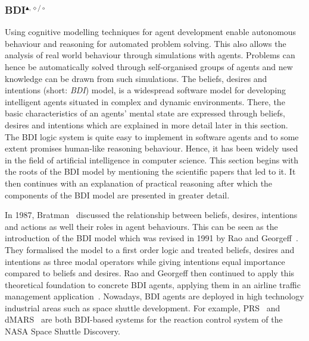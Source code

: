 \subsubsection[BDI]{BDI$^{\blacktriangle,\diamond/\circ}$}\label{fun:BDI}
Using cognitive modelling techniques for agent development enable autonomous behaviour and reasoning for automated problem solving.
This also allows the analysis of real world behaviour through simulations with agents.
Problems can hence be automatically solved through self-organised groups of agents and new knowledge can be drawn from such simulations.
The beliefs, desires and intentions (short: \emph{BDI}) model, is a widespread software model for developing intelligent agents situated in complex and dynamic environments.
There, the basic characteristics of an agents' mental state are expressed through beliefs, desires and intentions which are explained in more detail later in this section.
The BDI logic system is quite easy to implement in software agents and to some extent promises human-like reasoning behaviour.
Hence, it has been widely used in the field of artificial intelligence in computer science.
This section begins with the roots of the BDI model by mentioning the scientific papers that led to it.
It then continues with an explanation of practical reasoning after which the components of the BDI model are presented in greater detail.

In 1987, Bratman~\cite{MICHAEL_PlansResource_1988} discussed the relationship between beliefs, desires, intentions and actions as well their roles in agent behaviours.
This can be seen as the introduction of the BDI model which was revised in 1991 by Rao and Georgeff~\cite{rao_modeling_1991}.
They formalised the model to a first order logic and treated beliefs, desires and intentions as three modal operators while giving intentions equal importance compared to beliefs and desires.
Rao and Georgeff then continued to apply this theoretical foundation to concrete BDI agents, applying them in an airline traffic management application~\cite{Rao_BDITheory_1995}.
Nowadays, BDI agents are deployed in high technology industrial areas such as space shuttle development.
For example, PRS~\cite{Ingrand_PRS_1992} and dMARS~\cite{Mark_dMARS_2004} are both BDI-based systems for the reaction control system of the NASA Space Shuttle Discovery.

